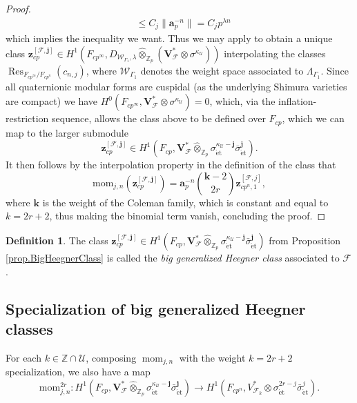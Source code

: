 \documentclass[a4paper]{amsart}
\numberwithin{equation}{section}
\theoremstyle{definition}
\newtheorem{definition}[theorem]{Definition}
\newcommand{\Z}{\mathbb{Z}}
\DeclareMathOperator{\et}{\text{\'et}}
\DeclareMathOperator{\mom}{mom}
\DeclareMathOperator{\Res}{Res}
\renewcommand{\et}{\mathrm{\acute{e}t}}
\begin{document}
\begin{proof}
\begin{align*}
&\le C_{j}\|\mathbf{a}_p^{-n}\| = C_{j}p^{\lambda n}
\end{align*}
which implies the inequality we want. Thus we may apply \cite[Proposition 2.3.3]{LoefflerZerbes.Rankin} to obtain a unique class $\mathbf{z}_{cp}^{[\mathscr{F},\mathbf{j}]}\in H^1(F_{cp^\infty}, D_{\mathscr{W}_{\Gamma_1},\lambda}\widehat{\otimes}_{\Z_p}(\mathbf{V}_\mathscr{F}^\ast{\otimes}\sigma^{\kappa_{{\mathscr{U}}}}))$ interpolating the classes $\Res_{F_{cp^\infty}/F_{cp^n}}(c_{n,j})$, where $\mathscr{W}_{\Gamma_1}$ denotes the weight space associated to $\Lambda_{\Gamma_1}$. Since all quaternionic modular forms are cuspidal (as the underlying Shimura varieties are compact) we have $H^0(F_{cp^\infty},\mathbf{V}_\mathscr{F}^\ast{\otimes}\sigma^{\kappa_{{\mathscr{U}}}})=0$, which, via the inflation-restriction sequence, allows the class above to be defined over $F_{cp}$, which we can map to the larger submodule \[\mathbf{z}_{cp}^{[\mathscr{F},\mathbf{j}]}\in H^1\left(F_{cp},\mathbf{V}_{\mathscr{F}}^\ast\widehat\otimes_{\Z_p}
\sigma_{\et}^{\kappa_{{\mathscr{U}}}-\mathbf{j}}\bar\sigma_{\et}^{\mathbf{j}}\right).\]It then follows by the interpolation property in the definition of the class that \[\mathrm{mom}_{j,n}(\mathbf{z}_{cp}^{[\mathscr{F},\mathbf{j}]})=\mathbf{a}_p^{-n}\binom{\mathbf{k}-2}{2r}\mathbf{z}^{[\mathscr{F},j]}_{cp^n,1},\] where $\mathbf{k}$ is the weight of the Coleman family, which is constant and equal to $k=2r+2$, thus making the binomial term vanish, concluding the proof.
\end{proof}

\begin{definition}
The class $\mathbf{z}_{cp}^{[\mathscr{F},\mathbf{j}]}\in H^1\left(F_{cp},\mathbf{V}_{\mathscr{F}}^\ast\widehat\otimes_{\Z_p}
\sigma_{\et}^{\kappa_{{\mathscr{U}}}-\mathbf{j}}\bar\sigma_{\et}^{\mathbf{j}}\right)$ from Proposition \ref{prop.BigHeegnerClass} is called the \textit{big generalized Heegner class} associated to $\mathscr{F}$.
\end{definition}

\subsection{Specialization of big generalized Heegner classes}

For each $k\in\Z\cap\mathscr{U}$, composing $\mom_{j,n}$ with the weight $k=2r+2$ specialization, we also have a map 
\[\mathrm{mom}_{j,n}^{2r}\colon H^1\left(F_{cp},\mathbf{V}_{\mathscr{F}}^\ast\widehat\otimes_{\Z_p}
\sigma_{\et}^{\kappa_{{\mathscr{U}}}-\mathbf{j}}\bar\sigma_{\et}^{\mathbf{j}}
\right)\longrightarrow H^1(F_{cp^n},V_{\mathcal{F}_{k}}^*\otimes\sigma_{\et}^{2r-j}\bar\sigma_{\et}^j).\]
\end{document}
